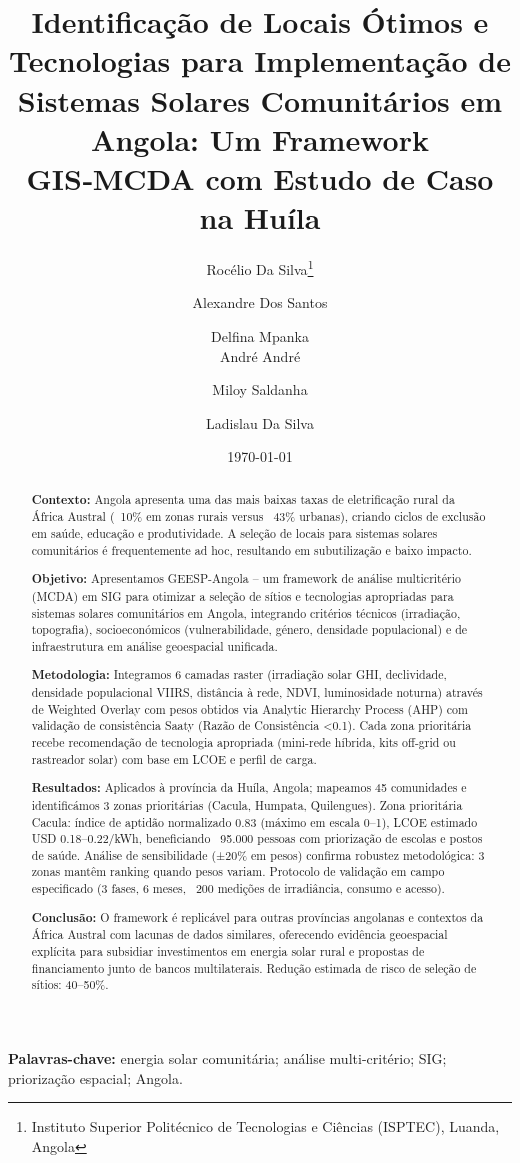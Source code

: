 \documentclass[12pt, a4paper]{article}
\begin{document}
\title{Identificação de Locais Ótimos e Tecnologias para Implementação de Sistemas Solares Comunitários em Angola: Um Framework GIS‑MCDA com Estudo de Caso na Huíla}
\author{Rocélio Da Silva\thanks{Instituto Superior Politécnico de Tecnologias e Ciências (ISPTEC), Luanda, Angola} \and Alexandre Dos Santos\footnotemark[1] \and Delfina Mpanka\footnotemark[1] \\
André André\footnotemark[1] \and Miloy Saldanha\footnotemark[1] \and Ladislau Da Silva\footnotemark[1]}
\date{\today}
\maketitle

\begin{abstract}
\textbf{Contexto:} Angola apresenta uma das mais baixas taxas de eletrificação rural da África Austral (~10\% em zonas rurais versus ~43\% urbanas), criando ciclos de exclusão em saúde, educação e produtividade. A seleção de locais para sistemas solares comunitários é frequentemente ad hoc, resultando em subutilização e baixo impacto.

\textbf{Objetivo:} Apresentamos GEESP-Angola – um framework de análise multicritério (MCDA) em SIG para otimizar a seleção de sítios e tecnologias apropriadas para sistemas solares comunitários em Angola, integrando critérios técnicos (irradiação, topografia), socioeconómicos (vulnerabilidade, género, densidade populacional) e de infraestrutura em análise geoespacial unificada.

\textbf{Metodologia:} Integramos 6 camadas raster (irradiação solar GHI, declividade, densidade populacional VIIRS, distância à rede, NDVI, luminosidade noturna) através de Weighted Overlay com pesos obtidos via Analytic Hierarchy Process (AHP) com validação de consistência Saaty (Razão de Consistência <0.1). Cada zona prioritária recebe recomendação de tecnologia apropriada (mini-rede híbrida, kits off-grid ou rastreador solar) com base em LCOE e perfil de carga.

\textbf{Resultados:} Aplicados à província da Huíla, Angola; mapeamos 45 comunidades e identificámos 3 zonas prioritárias (Cacula, Humpata, Quilengues). Zona prioritária Cacula: índice de aptidão normalizado 0.83 (máximo em escala 0–1), LCOE estimado USD 0.18–0.22/kWh, beneficiando ~95.000 pessoas com priorização de escolas e postos de saúde. Análise de sensibilidade (±20\% em pesos) confirma robustez metodológica: 3 zonas mantêm ranking quando pesos variam. Protocolo de validação em campo especificado (3 fases, 6 meses, ~200 medições de irradiância, consumo e acesso).

\textbf{Conclusão:} O framework é replicável para outras províncias angolanas e contextos da África Austral com lacunas de dados similares, oferecendo evidência geoespacial explícita para subsidiar investimentos em energia solar rural e propostas de financiamento junto de bancos multilaterais. Redução estimada de risco de seleção de sítios: 40–50\%.
\end{abstract}
\vspace{6pt}
\noindent\textbf{Palavras-chave:} energia solar comunitária; análise multi-critério; SIG; priorização espacial; Angola.
\end{document}
